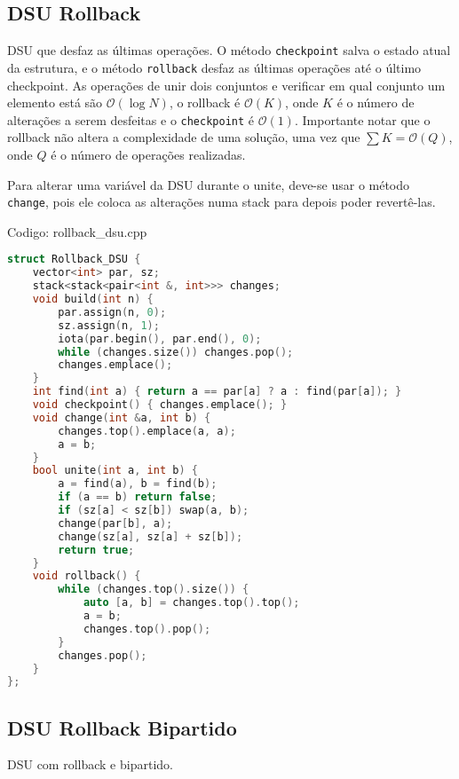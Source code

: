 \documentclass[10pt, a4paper, oneside]{book}
\begin{document}
\subsection{DSU Rollback}


DSU que desfaz as últimas operações. O método \texttt{checkpoint} salva o estado atual da estrutura, e o método \texttt{rollback} desfaz as últimas operações até o último checkpoint. As operações de unir dois conjuntos e verificar em qual conjunto um elemento está são $\mathcal{O}(\log N)$, o rollback é $\mathcal{O}(K)$, onde $K$ é o número de alterações a serem desfeitas e o \texttt{checkpoint} é $\mathcal{O}(1)$. Importante notar que o rollback não altera a complexidade de uma solução, uma vez que $\sum K = \mathcal{O}(Q)$, onde $Q$ é o número de operações realizadas.



Para alterar uma variável da DSU durante o unite, deve-se usar o método \texttt{change}, pois ele coloca as alterações numa stack para depois poder revertê-las.
\hfill

Codigo: rollback\_dsu.cpp

\begin{lstlisting}[language=C++]
struct Rollback_DSU {
    vector<int> par, sz;
    stack<stack<pair<int &, int>>> changes;
    void build(int n) {
        par.assign(n, 0);
        sz.assign(n, 1);
        iota(par.begin(), par.end(), 0);
        while (changes.size()) changes.pop();
        changes.emplace();
    }
    int find(int a) { return a == par[a] ? a : find(par[a]); }
    void checkpoint() { changes.emplace(); }
    void change(int &a, int b) {
        changes.top().emplace(a, a);
        a = b;
    }
    bool unite(int a, int b) {
        a = find(a), b = find(b);
        if (a == b) return false;
        if (sz[a] < sz[b]) swap(a, b);
        change(par[b], a);
        change(sz[a], sz[a] + sz[b]);
        return true;
    }
    void rollback() {
        while (changes.top().size()) {
            auto [a, b] = changes.top().top();
            a = b;
            changes.top().pop();
        }
        changes.pop();
    }
};\end{lstlisting}
\hfill

\subsection{DSU Rollback Bipartido}


DSU com rollback e bipartido.

\hfill
\end{document}
